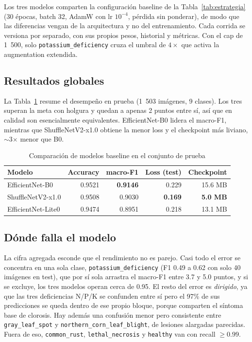 \documentclass[12pt,letterpaper]{article}
\begin{document}
Los tres modelos comparten la configuraci\'on baseline de la Tabla~\ref{tab:estrategia} (30 \'epocas, batch 32, AdamW con lr $10^{-4}$, p\'erdida sin ponderar), de modo que las diferencias vengan de la arquitectura y no del entrenamiento. Cada corrida se versiona por separado, con sus propios pesos, historial y m\'etricas. Con el cap de 1~500, solo \texttt{potassium\_deficiency} cruza el umbral de $4\times$ que activa la augmentation extendida.

\subsection{Resultados globales}

La Tabla~\ref{tab:results} resume el desempe\~no en prueba (1~503 im\'agenes, 9 clases). Los tres superan la meta con holgura y quedan a apenas 2 puntos entre s\'i, as\'i que en calidad son esencialmente equivalentes. EfficientNet-B0 lidera el macro-F1, mientras que ShuffleNetV2-x1.0 obtiene la menor loss y el checkpoint m\'as liviano, $\sim$3$\times$ menor que B0.

\begin{table}[H]
\caption{Comparaci\'on de modelos baseline en el conjunto de prueba}
\label{tab:results}
\centering
\begin{singlespace}
\begin{tabular}{lrrrr}
\toprule
\textbf{Modelo} & \textbf{Accuracy} & \textbf{macro-F1} & \textbf{Loss (test)} & \textbf{Checkpoint} \\
\midrule
EfficientNet-B0 & 0.9521 & \textbf{0.9146} & 0.229 & 15.6 MB \\
ShuffleNetV2-x1.0 & 0.9508 & 0.9030 & \textbf{0.169} & \textbf{5.0 MB} \\
EfficientNet-Lite0 & 0.9474 & 0.8951 & 0.218 & 13.1 MB \\
\bottomrule
\end{tabular}
\end{singlespace}
\end{table}

\subsection{D\'onde falla el modelo}

La cifra agregada esconde que el rendimiento no es parejo. Casi todo el error se concentra en una sola clase, \texttt{potassium\_deficiency} (F1 0.49 a 0.62 con solo 40 im\'agenes en test), que por s\'i sola arrastra el macro-F1 entre 3.7 y 5.0 puntos, y si se excluye, los tres modelos operan cerca de 0.95. El resto del error es \textit{dirigido}, ya que las tres deficiencias N/P/K se confunden entre s\'i pero el 97\% de sus predicciones se queda dentro de ese propio bloque, porque comparten el s\'intoma base de clorosis. Hay adem\'as una confusi\'on menor pero consistente entre \texttt{gray\_leaf\_spot} y \texttt{northern\_corn\_leaf\_blight}, de lesiones alargadas parecidas. Fuera de eso, \texttt{common\_rust}, \texttt{lethal\_necrosis} y \texttt{healthy} van con recall $\geq0.99$.
\end{document}
